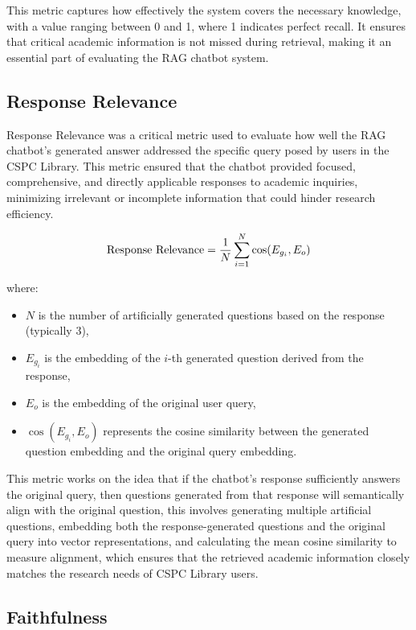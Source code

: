 \begin{refsection}
This metric captures how effectively the system covers the necessary knowledge, with a value ranging between 0 and 1, where 1 indicates perfect recall. It ensures that critical academic information is not missed during retrieval, making it an essential part of evaluating the RAG chatbot system.


\subsection*{Response Relevance}

Response Relevance was a critical metric used to evaluate how well the RAG chatbot's generated answer addressed the specific query posed by users in the CSPC Library. This metric ensured that the chatbot provided focused, comprehensive, and directly applicable responses to academic inquiries, minimizing irrelevant or incomplete information that could hinder research efficiency.

\begin{equation}
\centering
\text{Response Relevance} = \frac{1}{N} \sum_{i=1}^{N} \cos(E_{g_i}, E_o)
\end{equation}

where:
\begin{itemize}
    \item $N$ is the number of artificially generated questions based on the response (typically 3),
    \item $E_{g_i}$ is the embedding of the $i$-th generated question derived from the response,
    \item $E_o$ is the embedding of the original user query,
    \item $\cos(E_{g_i}, E_o)$ represents the cosine similarity between the generated question embedding and the original query embedding.
\end{itemize}

This metric works on the idea that if the chatbot's response sufficiently answers the original query, then questions generated from that response will semantically align with the original question, this involves generating multiple artificial questions, embedding both the response-generated questions and the original query into vector representations, and calculating the mean cosine similarity to measure alignment, which ensures that the retrieved academic information closely matches the research needs of CSPC Library users.

\subsection*{Faithfulness}


\end{refsection}
